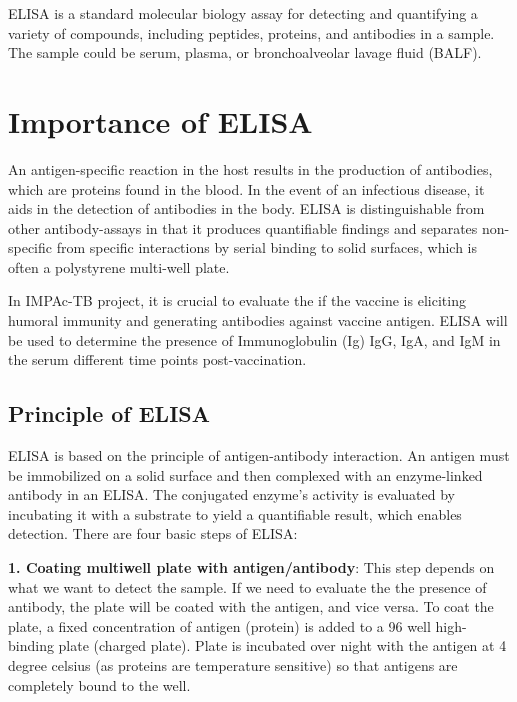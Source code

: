 \documentclass[
]{book}
\begin{document}
ELISA is a standard molecular biology assay for detecting and quantifying a
variety of compounds, including peptides, proteins, and antibodies in a sample.
The sample could be serum, plasma, or bronchoalveolar lavage fluid (BALF).

\hypertarget{importance-of-elisa}{%
\section{\texorpdfstring{\textbf{Importance of ELISA}}{Importance of ELISA}}\label{importance-of-elisa}}

An antigen-specific reaction in the host results in the production of antibodies, which are proteins found in the blood. In the event of an infectious disease,
it aids in the detection of antibodies in the body. ELISA is distinguishable from other antibody-assays in that it produces quantifiable findings and separates non-specific from specific interactions by serial binding to solid surfaces,
which is often a polystyrene multi-well plate.

In IMPAc-TB project, it is crucial to evaluate the if the vaccine is eliciting humoral immunity and generating antibodies against vaccine antigen. ELISA will
be used to determine the presence of Immunoglobulin (Ig) IgG, IgA, and IgM in
the serum different time points post-vaccination.

\hypertarget{principle-of-elisa}{%
\subsection{\texorpdfstring{\textbf{Principle of ELISA}}{Principle of ELISA}}\label{principle-of-elisa}}

ELISA is based on the principle of antigen-antibody interaction. An antigen must be immobilized on a solid surface and then complexed with an enzyme-linked antibody in an ELISA. The conjugated enzyme's activity is evaluated by incubating it with a substrate to yield a quantifiable result, which enables detection. There are four basic steps of ELISA:

\textbf{1. Coating multiwell plate with antigen/antibody}: This step depends on what we want to detect the sample. If we need to evaluate the the presence of antibody, the plate will be coated with the antigen, and vice versa. To coat the plate, a fixed concentration of antigen (protein) is added to a 96 well high-binding plate (charged plate). Plate is incubated over night with the antigen at 4 degree celsius (as proteins are temperature sensitive) so that antigens are completely bound to the well.
\end{document}
